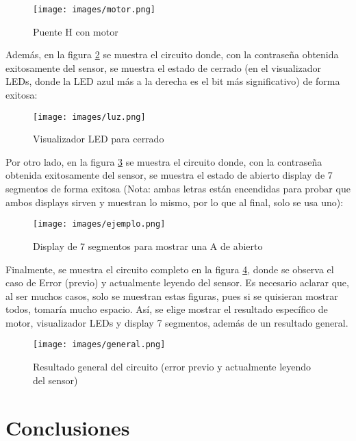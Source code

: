 \documentclass[conference]{IEEEtran}  %
\begin{document}
\begin{figure}[h]
    \centering
    \texttt{[image: images/motor.png]}
    \caption{Puente H con motor}
    \label{fig:motor}
\end{figure}

Además, en la figura \ref{fig:luz} se muestra el circuito donde, con la contraseña obtenida exitosamente del sensor, se muestra el estado de cerrado (en el visualizador LEDs, donde la LED azul más a la derecha es el bit más significativo) de forma exitosa:

\begin{figure}[h]
    \centering
    \texttt{[image: images/luz.png]}
    \caption{Visualizador LED para cerrado}
    \label{fig:luz}
\end{figure}

Por otro lado, en la figura \ref{fig:ejemplo} se muestra el circuito donde, con la contraseña obtenida exitosamente del sensor, se muestra el estado de abierto display de 7 segmentos de forma exitosa (Nota: ambas letras están encendidas para probar que ambos displays sirven y muestran lo mismo, por lo que al final, solo se usa uno):

\begin{figure}[h]
    \centering
    \texttt{[image: images/ejemplo.png]}
    \caption{Display de 7 segmentos para mostrar una A de abierto}
    \label{fig:ejemplo}
\end{figure}

Finalmente, se muestra el circuito completo en la figura \ref{fig:general}, donde se observa el caso de Error (previo) y actualmente leyendo del sensor. Es necesario aclarar que, al ser muchos casos, solo se muestran estas figuras, pues si se quisieran mostrar todos, tomaría mucho espacio. Así, se elige mostrar el resultado específico de motor, visualizador LEDs y display 7 segmentos, además de un resultado general.

\begin{figure}[h]
    \centering
    \texttt{[image: images/general.png]}
    \caption{Resultado general del circuito (error previo y actualmente leyendo del sensor)}
    \label{fig:general}
\end{figure}

\section{Conclusiones}
\end{document}
